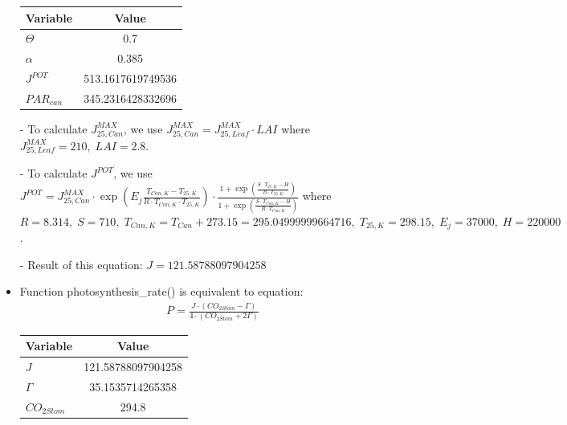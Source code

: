 \documentclass[a4paper]{article}
\begin{document}
\begin{itemize}
        \begin{table}[H]
          \centering
          \begin{tabular}{@{}lS[table-format=3.13]@{}}
            \toprule
            \textbf{Variable} & \textbf{Value}    \\
            \midrule
            \(\Theta\)        & 0.7               \\
            \(\alpha\)        & 0.385             \\
            \(J^{POT}\)       & 513.1617619749536 \\
            \(PAR_{can}\)     & 345.2316428332696 \\
            \bottomrule
          \end{tabular}
        \end{table}

  \item[-] To calculate \(J^{MAX}_{25,Can}\), we use \(J^{MAX}_{25,Can} = J^{MAX}_{25,Leaf} \cdot LAI\) where \(J^{MAX}_{25,Leaf} = 210,\; LAI = 2.8\).
  \item[-] To calculate \(J^{POT}\), we use \(J^{POT} = J^{MAX}_{25,Can} \cdot \exp \left(E_j\frac{T_{Can,K}-T_{25,K}}{R\cdot T_{Can,K}\cdot T_{25,K}}\right) \cdot \frac{1 + \exp \left(\frac{S\cdot T_{25,K}-H}{R\cdot T_{25,K}}\right)}{1 + \exp \left(\frac{S\cdot T_{Can,K}-H}{R\cdot T_{Can,K}}\right)}\) where \(R = 8.314,\; S = 710,\; T_{Can,K} = T_{Can} + 273.15 = 295.04999999664716,\; T_{25,K} = 298.15,\; E_j = 37000,\; H = 220000\).
  \item[-] Result of this equation: \(J = 121.58788097904258\)

  \item Function photosynthesis\_rate() is equivalent to equation:
        \begin{align*}
          P = \frac{J \cdot (CO_{2Stom} - \Gamma)}{4 \cdot (CO_{2Stom} + 2\Gamma)}
        \end{align*}

        \begin{table}[H]
          \centering
          \begin{tabular}{@{}lS[table-format=3.15]@{}}
            \toprule
            \textbf{Variable} & \textbf{Value}     \\
            \midrule
            \(J\)             & 121.58788097904258 \\
            \(\Gamma\)        & 35.1535714265358   \\
            \(CO_{2Stom}\)    & 294.8              \\
            \bottomrule
          \end{tabular}
        \end{table}


\end{itemize}
\end{document}
